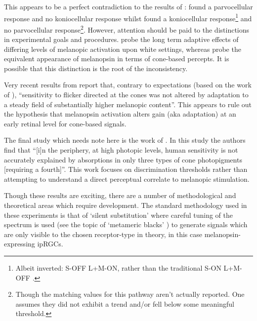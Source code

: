This appears to be a perfect contradiction to the results of \citet{cao_evidence_2018}: \citet{cao_evidence_2018} found a parvocellular response and no koniocellular response whilst \citet{zele_melanopsin_2018} found a koniocellular response\footnote{Albeit inverted: S-OFF L+M-ON, rather than the traditional S-ON L+M-OFF \citep{hendry_koniocellular_2000}.} and no parvocellular response\footnote{Though the matching values for this pathway aren't actually reported. One assumes they did not exhibit a trend and/or fell below some meaningful threshold.}. However, attention should be paid to the distinctions in experimental goals and procedures. \citet{cao_evidence_2018} probe the long term adaptive effects of differing levels of melanopic activation upon white settings, whereas \citet{zele_melanopsin_2019} probe the equivalent appearance of melanopsin in terms of cone-based percepts. It is possible that this distinction is the root of the inconsistency.

Very recent results from \citet{vincent_adaptation_2019,vincent_adaptation_2019-1} report that, contrary to expectations (based on the work of \citet{allen_melanopsin-driven_2014}), ``sensitivity to flicker directed at the cones was not altered by adaptation to a steady field of substantially higher melanopic content''. This appears to rule out the hypothesis that melanopsin activation alters gain (aka adaptation) at an early retinal level for cone-based signals.

The final study which needs note here is the work of \citet{horiguchi_human_2013}. In this study the authors find that ``[i]n the periphery, at high photopic levels, human sensitivity is not accurately explained by absorptions in only three types of cone photopigments [requiring a fourth]''. This work focuses on discrimination thresholds rather than attempting to understand a direct perceptual correlate to melanopic stimulation.

Though these results are exciting, there are a number of methodological and theoretical areas which require development. The standard methodology used in these experiments is that of `silent substitution' \citep{estevez_silent_1982,kamar_silent-substitution_2019,spitschan_method_2018} where careful tuning of the spectrum is used (see the topic of `metameric blacks' \citep{vienot_verriest_2014,cohen_metameric_1982,vienot_domain_2012,vienot_dimensionality_2015}) to generate signals which are only visible to the chosen receptor-type in theory, in this case melanopsin-expressing \glspl{ipRGC}. 

